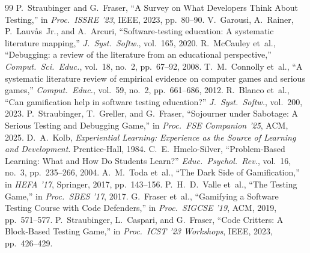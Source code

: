 \documentclass[conference]{IEEEtran}
\begin{document}
\balance

\begin{thebibliography}{99}
 P.~Straubinger and G.~Fraser, ``A Survey on What Developers Think About Testing,'' in \emph{Proc.\ ISSRE '23}, IEEE, 2023, pp.~80--90.
 V.~Garousi, A.~Rainer, P.~Lauv\aa{}s~Jr., and A.~Arcuri, ``Software-testing education: A systematic literature mapping,'' \emph{J.\ Syst.\ Softw.}, vol.~165, 2020.
 R.~McCauley et~al., ``Debugging: a review of the literature from an educational perspective,'' \emph{Comput.\ Sci.\ Educ.}, vol.~18, no.~2, pp.~67--92, 2008.
 T.~M.~Connolly et~al., ``A systematic literature review of empirical evidence on computer games and serious games,'' \emph{Comput.\ Educ.}, vol.~59, no.~2, pp.~661--686, 2012.
 R.~Blanco et~al., ``Can gamification help in software testing education?'' \emph{J.\ Syst.\ Softw.}, vol.~200, 2023.
 P.~Straubinger, T.~Greller, and G.~Fraser, ``Sojourner under Sabotage: A Serious Testing and Debugging Game,'' in \emph{Proc.\ FSE Companion '25}, ACM, 2025.
 D.~A.~Kolb, \emph{Experiential Learning: Experience as the Source of Learning and Development}. Prentice-Hall, 1984.
 C.~E.~Hmelo-Silver, ``Problem-Based Learning: What and How Do Students Learn?'' \emph{Educ.\ Psychol.\ Rev.}, vol.~16, no.~3, pp.~235--266, 2004.
 A.~M.~Toda et~al., ``The Dark Side of Gamification,'' in \emph{HEFA '17}, Springer, 2017, pp.~143--156.
 P.~H.~D.~Valle et~al., ``The Testing Game,'' in \emph{Proc.\ SBES '17}, 2017.
 G.~Fraser et~al., ``Gamifying a Software Testing Course with Code Defenders,'' in \emph{Proc.\ SIGCSE '19}, ACM, 2019, pp.~571--577.
 P.~Straubinger, L.~Caspari, and G.~Fraser, ``Code Critters: A Block-Based Testing Game,'' in \emph{Proc.\ ICST '23 Workshops}, IEEE, 2023, pp.~426--429.
\end{thebibliography}
\end{document}
